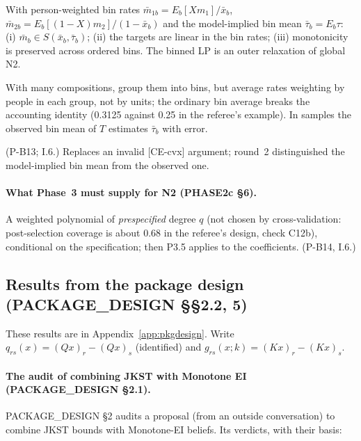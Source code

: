 \begin{result}\label{res:n24}
 With person-weighted bin rates
$\bar m_{1b}=E_b[Xm_1]/\bar x_b$, $\bar m_{2b}=E_b[(1-X)m_2]/(1-\bar x_b)$ and the
model-implied bin mean $\bar\tau_b=E_b\tau$: (i) $\bar m_b\in S(\bar x_b,\bar\tau_b)$;
(ii) the targets are linear in the bin rates; (iii) monotonicity is preserved
across ordered bins. The binned LP is an outer relaxation of global N2.
\end{result}
\begin{plain}
With many compositions, group them into bins, but average rates weighting by
people in each group, not by units; the ordinary bin average breaks the
accounting identity (0.3125 against 0.25 in the referee's example). In samples the
observed bin mean of $T$ estimates $\bar\tau_b$ with error.
\end{plain}
\begin{revnote}(P-B13; I.6.) Replaces an invalid [CE-cvx] argument; round~2 distinguished the model-implied bin mean from the observed one.\end{revnote}

\paragraph{What Phase~3 must supply for N2 (PHASE2c \S6).} A weighted polynomial of
\emph{prespecified} degree $q$ (not chosen by cross-validation: post-selection
coverage is about 0.68 in the referee's design, check C12b), conditional on the
specification; then P3.5 applies to the coefficients. (P-B14, I.6.)

\subsection{Results from the package design (PACKAGE\_DESIGN \S\S2.2, 5)}

These results are in Appendix~\ref{app:pkgdesign}. Write
$q_{rs}(x)=(Qx)_r-(Qx)_s$ (identified) and $g_{rs}(x;k)=(Kx)_r-(Kx)_s$.

\paragraph{The audit of combining JKST with Monotone EI (PACKAGE\_DESIGN \S2.1).}
PACKAGE\_DESIGN \S2 audits a proposal (from an outside conversation) to combine
JKST bounds with Monotone-EI beliefs. Its verdicts, with their basis:

